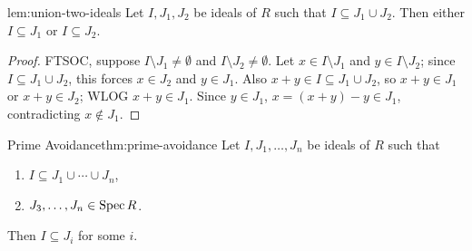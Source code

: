 \begin{lemma}{}{lem:union-two-ideals}
Let $I, J_1, J_2$ be ideals of $R$ such that $I \subseteq J_1 \cup J_2$. Then either $I \subseteq J_1$ or $I \subseteq J_2$.
\end{lemma}

\begin{proof}
FTSOC, suppose $I \setminus J_1 \neq \emptyset$ and $I \setminus J_2 \neq \emptyset$. Let $x \in I \setminus J_1$ and $y \in I \setminus J_2$; since $I \subseteq J_1 \cup J_2$, this forces $x \in J_2$ and $y \in J_1$. Also $x+y \in I \subseteq J_1 \cup J_2$, so $x+y \in J_1$ or $x+y \in J_2$; WLOG $x+y \in J_1$. Since $y \in J_1$, $x = (x+y) - y \in J_1$, contradicting $x \notin J_1$.
\end{proof}

\begin{theorem}{Prime Avoidance}{thm:prime-avoidance}
Let $I, J_1, \ldots, J_n$ be ideals of $R$ such that
\begin{enumerate}[label=(\arabic*)]
    \item $I \subseteq J_1 \cup \cdots \cup J_n$,
    \item $J_3, \ldots, J_n \in \operatorname{Spec} R$.
\end{enumerate}
Then $I \subseteq J_i$ for some $i$.
\end{theorem}

